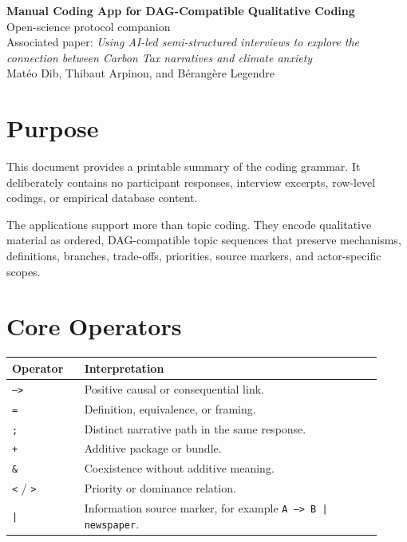 \documentclass[11pt,a4paper]{article}
\newcommand{\inlinecode}[1]{\texttt{#1}}
\begin{document}
\begin{center}
{\Large\bfseries Manual Coding App for DAG-Compatible Qualitative Coding}\\[0.4em]
{\normalsize Open-science protocol companion}\\[0.3em]
{\small Associated paper: \emph{Using AI-led semi-structured interviews to explore the connection between Carbon Tax narratives and climate anxiety}}\\
{\small Matéo Dib, Thibaut Arpinon, and Bérangère Legendre}
\end{center}

\section*{Purpose}

This document provides a printable summary of the coding grammar. It deliberately contains no participant responses, interview excerpts, row-level codings, or empirical database content.

The applications support more than topic coding. They encode qualitative material as ordered, DAG-compatible topic sequences that preserve mechanisms, definitions, branches, trade-offs, priorities, source markers, and actor-specific scopes.

\section*{Core Operators}

\begin{center}
\begin{tabular}{L{0.18\linewidth} L{0.74\linewidth}}
\toprule
\textbf{Operator} & \textbf{Interpretation} \\
\midrule
\inlinecode{-->} & Positive causal or consequential link. \\
\inlinecode{=} & Definition, equivalence, or framing. \\
\inlinecode{;} & Distinct narrative path in the same response. \\
\inlinecode{+} & Additive package or bundle. \\
\inlinecode{\&} & Coexistence without additive meaning. \\
\inlinecode{<} / \inlinecode{>} & Priority or dominance relation. \\
\inlinecode{|} & Information source marker, for example \inlinecode{A --> B | newspaper}. \\
\bottomrule
\end{tabular}
\end{center}
\end{document}
